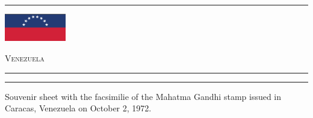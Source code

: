 \documentclass[a4paper]{article}
\begin{document}
\hrule
\vspace{8pt}
\begin{minipage}{2cm}
  \includegraphics[height=1.2cm]{images/ve}
\end{minipage}
\hfill
{\scshape\huge Venezuela}
\vspace{8pt}
\hrule
\vspace{17cm}
\begin{center}
  \begin{minipage}{10cm}
    \hrule \vspace{12pt} Souvenir sheet with the facsimilie of the Mahatma Gandhi stamp issued in Caracas, Venezuela on
    October 2, 1972.
  \end{minipage}
\end{center}
\end{document}
